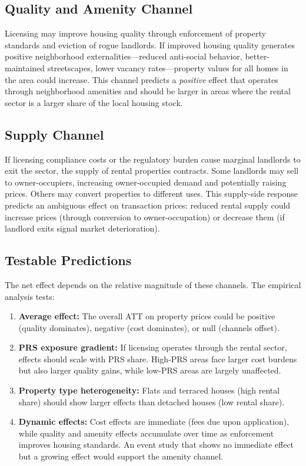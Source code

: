 \documentclass[12pt]{article}
\begin{document}
\subsection{Quality and Amenity Channel}

Licensing may improve housing quality through enforcement of property standards and eviction of rogue landlords. If improved housing quality generates positive neighborhood externalities---reduced anti-social behavior, better-maintained streetscapes, lower vacancy rates---property values for all homes in the area could increase. This channel predicts a \emph{positive} effect that operates through neighborhood amenities and should be larger in areas where the rental sector is a larger share of the local housing stock.

\subsection{Supply Channel}

If licensing compliance costs or the regulatory burden cause marginal landlords to exit the sector, the supply of rental properties contracts. Some landlords may sell to owner-occupiers, increasing owner-occupied demand and potentially raising prices. Others may convert properties to different uses. This supply-side response predicts an ambiguous effect on transaction prices: reduced rental supply could increase prices (through conversion to owner-occupation) or decrease them (if landlord exits signal market deterioration).

\subsection{Testable Predictions}

The net effect depends on the relative magnitude of these channels. The empirical analysis tests:
\begin{enumerate}
    \item \textbf{Average effect:} The overall ATT on property prices could be positive (quality dominates), negative (cost dominates), or null (channels offset).
    \item \textbf{PRS exposure gradient:} If licensing operates through the rental sector, effects should scale with PRS share. High-PRS areas face larger cost burdens but also larger quality gains, while low-PRS areas are largely unaffected.
    \item \textbf{Property type heterogeneity:} Flats and terraced houses (high rental share) should show larger effects than detached houses (low rental share).
    \item \textbf{Dynamic effects:} Cost effects are immediate (fees due upon application), while quality and amenity effects accumulate over time as enforcement improves housing standards. An event study that shows no immediate effect but a growing effect would support the amenity channel.
\end{enumerate}
\end{document}
